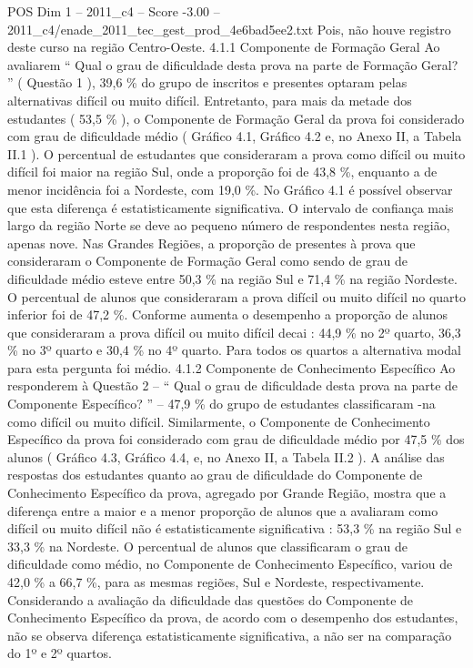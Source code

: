 \begin{textsample}{POS Dim 1 – 2011\_c4 – Score -3.00 – 2011\_c4/enade\_2011\_tec\_gest\_prod\_4e6bad5ee2.txt}
Pois, não houve registro deste curso na região Centro-Oeste. 4.1.1 Componente de Formação Geral Ao avaliarem “ Qual o grau de dificuldade desta prova na parte de Formação Geral? ” ( Questão 1 ), 39,6 \% do grupo de inscritos e presentes optaram pelas alternativas difícil ou muito difícil.
Entretanto, para mais da metade dos estudantes ( 53,5 \% ), o Componente de Formação Geral da prova foi considerado com grau de dificuldade médio ( Gráfico 4.1, Gráfico 4.2 e, no Anexo II, a Tabela II.1 ).
O percentual de estudantes que consideraram a prova como difícil ou muito difícil foi maior na região Sul, onde a proporção foi de 43,8 \%, enquanto a de menor incidência foi a Nordeste, com 19,0 \%.
No Gráfico 4.1 é possível observar que esta diferença é estatisticamente significativa.
O intervalo de confiança mais largo da região Norte se deve ao pequeno número de respondentes nesta região, apenas nove.
Nas Grandes Regiões, a proporção de presentes à prova que consideraram o Componente de Formação Geral como sendo de grau de dificuldade médio esteve entre 50,3 \% na região Sul e 71,4 \% na região Nordeste.
O percentual de alunos que consideraram a prova difícil ou muito difícil no quarto inferior foi de 47,2 \%.
Conforme aumenta o desempenho a proporção de alunos que consideraram a prova difícil ou muito difícil decai : 44,9 \% no 2º quarto, 36,3 \% no 3º quarto e 30,4 \% no 4º quarto.
Para todos os quartos a alternativa modal para esta pergunta foi médio. 4.1.2 Componente de Conhecimento Específico Ao responderem à Questão 2 – “ Qual o grau de dificuldade desta prova na parte de Componente Específico? ” – 47,9 \% do grupo de estudantes classificaram -na como difícil ou muito difícil.
Similarmente, o Componente de Conhecimento Específico da prova foi considerado com grau de dificuldade médio por 47,5 \% dos alunos ( Gráfico 4.3, Gráfico 4.4, e, no Anexo II, a Tabela II.2 ).
A análise das respostas dos estudantes quanto ao grau de dificuldade do Componente de Conhecimento Específico da prova, agregado por Grande Região, mostra que a diferença entre a maior e a menor proporção de alunos que a avaliaram como difícil ou muito difícil não é estatisticamente significativa : 53,3 \% na região Sul e 33,3 \% na Nordeste.
O percentual de alunos que classificaram o grau de dificuldade como médio, no Componente de Conhecimento Específico, variou de 42,0 \% a 66,7 \%, para as mesmas regiões, Sul e Nordeste, respectivamente.
Considerando a avaliação da dificuldade das questões do Componente de Conhecimento Específico da prova, de acordo com o desempenho dos estudantes, não se observa diferença estatisticamente significativa, a não ser na comparação do 1º e 2º quartos.

\end{textsample}
